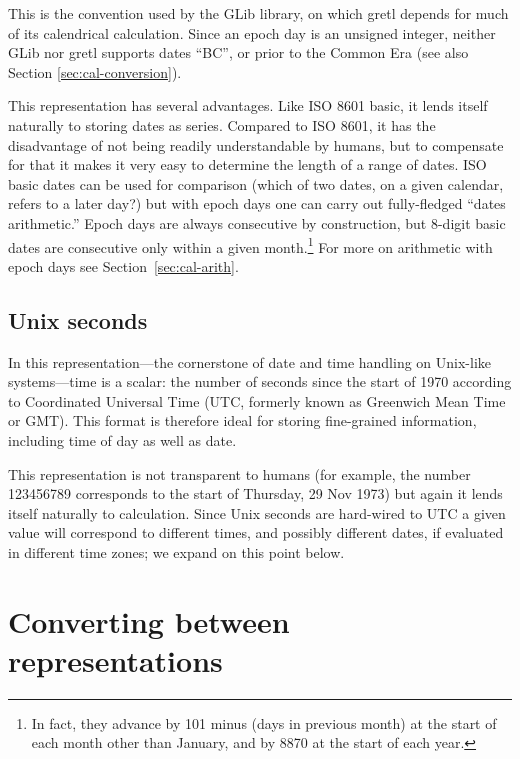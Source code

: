 This is the convention used by the \textsf{GLib} library, on which
gretl depends for much of its calendrical calculation. Since an epoch
day is an unsigned integer, neither \textsf{GLib} nor gretl supports
dates ``BC'', or prior to the Common Era (see also Section
\ref{sec:cal-conversion}).

This representation has several advantages. Like ISO 8601 basic, it
lends itself naturally to storing dates as series. Compared to ISO
8601, it has the disadvantage of not being readily understandable by
humans, but to compensate for that it makes it very easy to determine
the length of a range of dates.  ISO basic dates can be used for
comparison (which of two dates, on a given calendar, refers to a later
day?) but with epoch days one can carry out fully-fledged ``dates
arithmetic.''  Epoch days are always consecutive by construction, but
8-digit basic dates are consecutive only within a given
month.\footnote{In fact, they advance by 101 minus (days in previous
  month) at the start of each month other than January, and by 8870 at
  the start of each year.} For more on arithmetic with epoch days see
Section~\ref{sec:cal-arith}.

\subsection{Unix seconds}
\label{sec:cal-seconds}

In this representation---the cornerstone of date and time handling on
Unix-like systems---time is a scalar: the number of seconds since the
start of 1970 according to Coordinated Universal Time (UTC, formerly
known as Greenwich Mean Time or GMT). This format is therefore ideal
for storing fine-grained information, including time of day as well as
date.

This representation is not transparent to humans (for example, the
number 123456789 corresponds to the start of Thursday, 29 Nov 1973)
but again it lends itself naturally to calculation. Since Unix seconds
are hard-wired to UTC a given value will correspond to different
times, and possibly different dates, if evaluated in different time
zones; we expand on this point below.

\section{Converting between representations}
\label{sec:cal-conversions}

